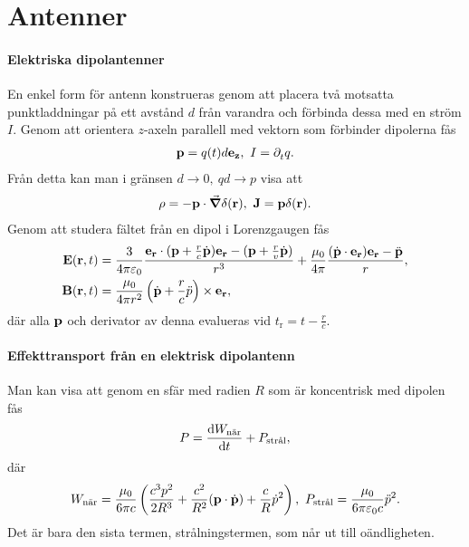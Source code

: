 \section{Antenner}

\paragraph{Elektriska dipolantenner}
En enkel form för antenn konstrueras genom att placera två motsatta punktladdningar på ett avstånd $d$ från varandra och förbinda dessa med en ström $I$. Genom att orientera $z$-axeln parallell med vektorn som förbinder dipolerna fås
\begin{align*}
	\vb{p} = q(t)d\vb{e}_{\vb{z}},\ I = \partial_{t}^{}q.
\end{align*}
Från detta kan man i gränsen $d\to 0,\ qd\to p$ visa att
\begin{align*}
	\rho = -\vb{p}\cdot\grad{\delta(\vb{r})},\ \vb{J} = \vb{p}\delta(\vb{r}).
\end{align*}
Genom att studera fältet från en dipol i Lorenzgaugen fås
\begin{align*}
	\vb{E}(\vb{r}, t) &= \frac{3}{4\pi\varepsilon_{0}}\frac{\vb{e}_{\vb{r}}\cdot(\vb{p} + \frac{r}{c}\dot{\vb{p}})\vb{e}_{\vb{r}} - (\vb{p} + \frac{r}{v}\dot{\vb{p}})}{r^{3}} + \frac{\mu_{0}}{4\pi}\frac{(\dot{\vb{p}}\cdot\vb{e}_{\vb{r}})\vb{e}_{\vb{r}} - \ddot{\vb{p}}}{r}, \\
	\vb{B}(\vb{r}, t) &= \frac{\mu_{0}}{4\pi r^{2}}\left(\dot{\vb{p}} + \frac{r}{c}\ddot{p}\right)\times\vb{e}_{\vb{r}},
\end{align*}
där alla $\vb{p}$ och derivator av denna evalueras vid $t_{\text{r}} = t - \frac{r}{c}$.

\paragraph{Effekttransport från en elektrisk dipolantenn}
Man kan visa att genom en sfär med radien $R$ som är koncentrisk med dipolen fås
\begin{align*}
	P = \dv{W_{\text{när}}}{t} + P_{\text{strål}},
\end{align*}
där
\begin{align*}
	W_{\text{när}} = \frac{\mu_{0}}{6\pi c}\left(\frac{c^{3}p^{2}}{2R^{3}} + \frac{c^{2}}{R^{2}}(\vb{p}\cdot\dot{\vb{p}}) + \frac{c}{R}\dot{p}^{2}\right),\ P_{\text{strål}} = \frac{\mu_{0}}{6\pi\varepsilon_{0}c}\ddot{p}^{2}.
\end{align*}
Det är bara den sista termen, strålningstermen, som når ut till oändligheten.
